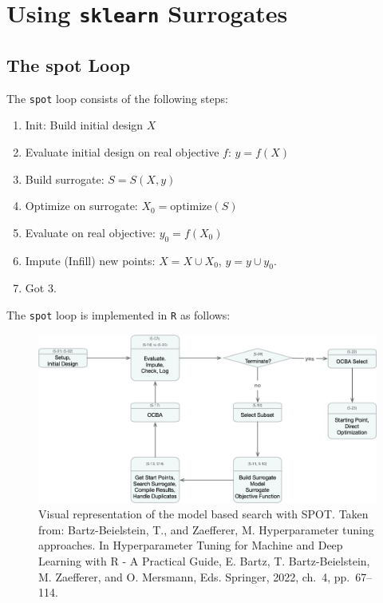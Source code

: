 \documentclass[
  letterpaper,
  DIV=11,
  numbers=noendperiod]{scrreprt}
\providecommand{\tightlist}{%
  \setlength{\itemsep}{0pt}\setlength{\parskip}{0pt}}\usepackage{longtable,booktabs,array}
\begin{document}
\section{\texorpdfstring{Using \texttt{sklearn}
Surrogates}{Using sklearn Surrogates}}\label{using-sklearn-surrogates}

\subsection{The spot Loop}\label{the-spot-loop}

The \texttt{spot} loop consists of the following steps:

\begin{enumerate}
\def\labelenumi{\arabic{enumi}.}
\tightlist
\item
  Init: Build initial design \(X\)
\item
  Evaluate initial design on real objective \(f\): \(y = f(X)\)
\item
  Build surrogate: \(S = S(X,y)\)
\item
  Optimize on surrogate: \(X_0 =  \text{optimize}(S)\)
\item
  Evaluate on real objective: \(y_0 = f(X_0)\)
\item
  Impute (Infill) new points: \(X = X \cup X_0\), \(y = y \cup y_0\).
\item
  Got 3.
\end{enumerate}

The \texttt{spot} loop is implemented in \texttt{R} as follows:

\begin{figure}[H]

{\centering \includegraphics{figures_static/spotModel.png}

}

\caption{Visual representation of the model based search with SPOT.
Taken from: Bartz-Beielstein, T., and Zaefferer, M. Hyperparameter
tuning approaches. In Hyperparameter Tuning for Machine and Deep
Learning with R - A Practical Guide, E. Bartz, T. Bartz-Beielstein, M.
Zaefferer, and O. Mersmann, Eds. Springer, 2022, ch.~4, pp.~67--114.}

\end{figure}%
\end{document}
